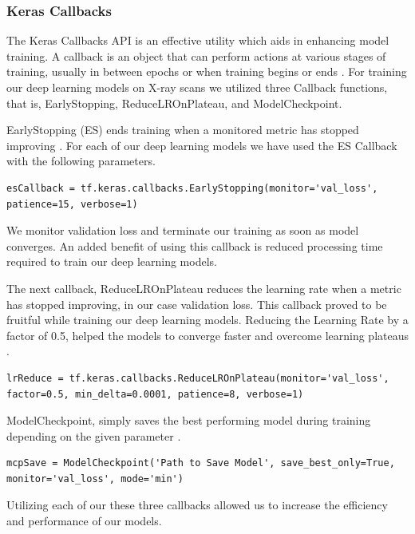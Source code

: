 \subsubsection{Keras Callbacks} \label{KCXray}

The Keras Callbacks API is an effective utility which aids in enhancing model training. A callback is an object that can perform actions at various stages of training, usually in between epochs or when training begins or ends \cite{KCB}. For training our deep learning models on X-ray scans we utilized three Callback functions, that is, EarlyStopping, ReduceLROnPlateau, and ModelCheckpoint.

EarlyStopping (ES) ends training when a monitored metric has stopped improving \cite{KES}. For each of our deep learning models we have used the ES Callback with the following parameters. 

\vspace{1em}
\begin{lstlisting}
esCallback = tf.keras.callbacks.EarlyStopping(monitor='val_loss', patience=15, verbose=1)
\end{lstlisting}

We monitor validation loss and terminate our training as soon as model converges. An added benefit of using this callback is reduced processing time required to train our deep learning models.

The next callback, ReduceLROnPlateau reduces the learning rate when a metric has stopped improving, in our case validation loss. This callback proved to be fruitful while training our deep learning models. Reducing the Learning Rate by a factor of 0.5, helped the models to converge faster and overcome learning plateaus \cite{KLR}. 
\vspace{1em}
\begin{lstlisting}
lrReduce = tf.keras.callbacks.ReduceLROnPlateau(monitor='val_loss', factor=0.5, min_delta=0.0001, patience=8, verbose=1)
\end{lstlisting}

ModelCheckpoint, simply saves the best performing model during training depending on the given parameter \cite{KMC}.
\vspace{1em}

\begin{lstlisting}
mcpSave = ModelCheckpoint('Path to Save Model', save_best_only=True, monitor='val_loss', mode='min')
\end{lstlisting}

Utilizing each of our these three callbacks allowed us to increase the efficiency and performance of our models.

